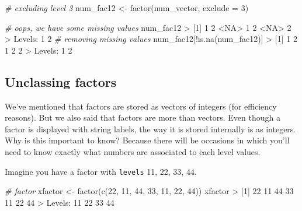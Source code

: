 \documentclass[
]{book}
\newenvironment{Shaded}{\begin{snugshade}}{\end{snugshade}}
\newcommand{\AttributeTok}[1]{\textcolor[rgb]{0.77,0.63,0.00}{#1}}
\newcommand{\CommentTok}[1]{\textcolor[rgb]{0.56,0.35,0.01}{\textit{#1}}}
\newcommand{\ConstantTok}[1]{\textcolor[rgb]{0.00,0.00,0.00}{#1}}
\newcommand{\DecValTok}[1]{\textcolor[rgb]{0.00,0.00,0.81}{#1}}
\newcommand{\FunctionTok}[1]{\textcolor[rgb]{0.00,0.00,0.00}{#1}}
\newcommand{\NormalTok}[1]{#1}
\newcommand{\OtherTok}[1]{\textcolor[rgb]{0.56,0.35,0.01}{#1}}
\newcommand{\SpecialCharTok}[1]{\textcolor[rgb]{0.00,0.00,0.00}{#1}}
\begin{document}
\begin{Shaded}
\begin{Highlighting}[]
\CommentTok{\# excluding level 3}
\NormalTok{num\_fac12 }\OtherTok{\textless{}{-}} \FunctionTok{factor}\NormalTok{(num\_vector, }\AttributeTok{exclude =} \DecValTok{3}\NormalTok{)}

\CommentTok{\# oops, we have some missing values}
\NormalTok{num\_fac12}
\SpecialCharTok{\textgreater{}}\NormalTok{ [}\DecValTok{1}\NormalTok{] }\DecValTok{1}    \DecValTok{2}    \SpecialCharTok{\textless{}}\ConstantTok{NA}\SpecialCharTok{\textgreater{}} \DecValTok{1}    \DecValTok{2}    \SpecialCharTok{\textless{}}\ConstantTok{NA}\SpecialCharTok{\textgreater{}} \DecValTok{2}   
\SpecialCharTok{\textgreater{}}\NormalTok{ Levels}\SpecialCharTok{:} \DecValTok{1} \DecValTok{2}
\CommentTok{\# removing missing values}
\NormalTok{num\_fac12[}\SpecialCharTok{!}\FunctionTok{is.na}\NormalTok{(num\_fac12)]}
\SpecialCharTok{\textgreater{}}\NormalTok{ [}\DecValTok{1}\NormalTok{] }\DecValTok{1} \DecValTok{2} \DecValTok{1} \DecValTok{2} \DecValTok{2}
\SpecialCharTok{\textgreater{}}\NormalTok{ Levels}\SpecialCharTok{:} \DecValTok{1} \DecValTok{2}
\end{Highlighting}
\end{Shaded}

\hypertarget{unclassing-factors}{%
\subsection{Unclassing factors}\label{unclassing-factors}}

We've mentioned that factors are stored as vectors of integers (for efficiency
reasons). But we also said that factors are more than vectors. Even though a
factor is displayed with string labels, the way it is stored internally is as
integers. Why is this important to know? Because there will be occasions in
which you'll need to know exactly what numbers are associated to each level
values.

Imagine you have a factor with \texttt{levels} 11, 22, 33, 44.

\begin{Shaded}
\begin{Highlighting}[]
\CommentTok{\# factor}
\NormalTok{xfactor }\OtherTok{\textless{}{-}} \FunctionTok{factor}\NormalTok{(}\FunctionTok{c}\NormalTok{(}\DecValTok{22}\NormalTok{, }\DecValTok{11}\NormalTok{, }\DecValTok{44}\NormalTok{, }\DecValTok{33}\NormalTok{, }\DecValTok{11}\NormalTok{, }\DecValTok{22}\NormalTok{, }\DecValTok{44}\NormalTok{))}
\NormalTok{xfactor}
\SpecialCharTok{\textgreater{}}\NormalTok{ [}\DecValTok{1}\NormalTok{] }\DecValTok{22} \DecValTok{11} \DecValTok{44} \DecValTok{33} \DecValTok{11} \DecValTok{22} \DecValTok{44}
\SpecialCharTok{\textgreater{}}\NormalTok{ Levels}\SpecialCharTok{:} \DecValTok{11} \DecValTok{22} \DecValTok{33} \DecValTok{44}
\end{Highlighting}
\end{Shaded}
\end{document}
